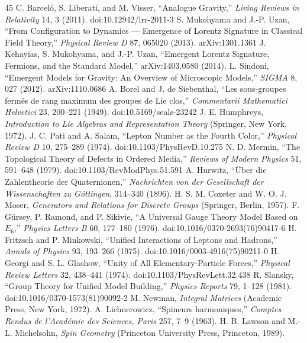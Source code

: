 \documentclass[11pt,a4paper]{article}
\begin{document}
\begin{thebibliography}{45}
 C. Barcel\'o, S. Liberati, and M. Visser, ``Analogue Gravity,'' \emph{Living Reviews in Relativity} 14, 3 (2011). doi:10.12942/lrr-2011-3
 S. Mukohyama and J.-P. Uzan, ``From Configuration to Dynamics --- Emergence of Lorentz Signature in Classical Field Theory,'' \emph{Physical Review D} 87, 065020 (2013). arXiv:1301.1361
 J. Kehayias, S. Mukohyama, and J.-P. Uzan, ``Emergent Lorentz Signature, Fermions, and the Standard Model,'' arXiv:1403.0580 (2014).
 L. Sindoni, ``Emergent Models for Gravity: An Overview of Microscopic Models,'' \emph{SIGMA} 8, 027 (2012). arXiv:1110.0686
 A. Borel and J. de Siebenthal, ``Les sous-groupes ferm\'es de rang maximum des groupes de Lie clos,'' \emph{Commentarii Mathematici Helvetici} 23, 200--221 (1949). doi:10.5169/seals-23242
 J. E. Humphreys, \emph{Introduction to Lie Algebras and Representation Theory} (Springer, New York, 1972).
 J. C. Pati and A. Salam, ``Lepton Number as the Fourth Color,'' \emph{Physical Review D} 10, 275--289 (1974). doi:10.1103/PhysRevD.10.275
 N. D. Mermin, ``The Topological Theory of Defects in Ordered Media,'' \emph{Reviews of Modern Physics} 51, 591--648 (1979). doi:10.1103/RevModPhys.51.591
 A. Hurwitz, ``\"Uber die Zahlentheorie der Quaternionen,'' \emph{Nachrichten von der Gesellschaft der Wissenschaften zu G\"ottingen}, 314--340 (1896).
 H. S. M. Coxeter and W. O. J. Moser, \emph{Generators and Relations for Discrete Groups} (Springer, Berlin, 1957).
 F. G\"ursey, P. Ramond, and P. Sikivie, ``A Universal Gauge Theory Model Based on $E_6$,'' \emph{Physics Letters B} 60, 177--180 (1976). doi:10.1016/0370-2693(76)90417-6
 H. Fritzsch and P. Minkowski, ``Unified Interactions of Leptons and Hadrons,'' \emph{Annals of Physics} 93, 193--266 (1975). doi:10.1016/0003-4916(75)90211-0
 H. Georgi and S. L. Glashow, ``Unity of All Elementary-Particle Forces,'' \emph{Physical Review Letters} 32, 438--441 (1974). doi:10.1103/PhysRevLett.32.438
 R. Slansky, ``Group Theory for Unified Model Building,'' \emph{Physics Reports} 79, 1--128 (1981). doi:10.1016/0370-1573(81)90092-2
 M. Newman, \emph{Integral Matrices} (Academic Press, New York, 1972).
 A. Lichnerowicz, ``Spineurs harmoniques,'' \emph{Comptes Rendus de l'Acad\'emie des Sciences, Paris} 257, 7--9 (1963).
 H. B. Lawson and M.-L. Michelsohn, \emph{Spin Geometry} (Princeton University Press, Princeton, 1989).

\end{thebibliography}
\end{document}
